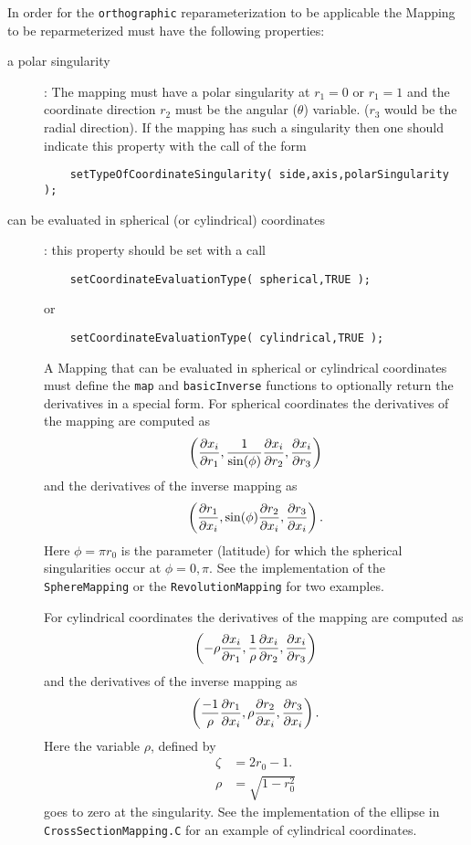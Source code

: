   In order for the {\tt orthographic} reparameterization to be applicable the Mapping
to be reparmeterized must have the following properties:
\begin{description}
  \item[a polar singularity] : The mapping must have a polar singularity at $r_1=0$ or
$r_1=1$ and the coordinate direction $r_2$ must be the angular ($\theta$) variable. ($r_3$ would
be the radial direction). If the mapping has such a singularity then one should indicate this
property with the call of the form
\begin{verbatim}
	setTypeOfCoordinateSingularity( side,axis,polarSingularity ); 
\end{verbatim}
  \item[can be evaluated in spherical (or cylindrical) coordinates]: this property should be set with a call
\begin{verbatim}
	setCoordinateEvaluationType( spherical,TRUE ); 
\end{verbatim}
or
\begin{verbatim}
	setCoordinateEvaluationType( cylindrical,TRUE ); 
\end{verbatim}
   A Mapping that can be evaluated in spherical or cylindrical coordinates must define the {\tt map} and
   {\tt basicInverse} functions to optionally return the derivatives
   in a special form. For spherical coordinates the derivatives of the mapping are computed as
\[
   \left({\partial x_i \over\partial r_1},{1\over\sin(\phi)}{\partial x_i \over\partial r_2},
         {\partial x_i \over\partial r_3} \right)
\]
and the derivatives of the inverse mapping as
\[
   \left({\partial r_1\over\partial x_i},\sin(\phi){\partial r_2 \over\partial x_i},
         {\partial r_3\over\partial x_i} \right).
\]
Here $\phi=\pi r_0$ is the parameter (latitude) for which the spherical singularities occur
at $\phi=0,\pi$.
See the implementation of the {\tt SphereMapping} or the {\tt RevolutionMapping} for two examples.

For cylindrical coordinates the derivatives of the mapping are computed as
\[
   \left(-\rho {\partial x_i \over\partial r_1},{1\over\rho}{\partial x_i \over\partial r_2},
         {\partial x_i \over\partial r_3} \right)
\]
and the derivatives of the inverse mapping as
\[
   \left({-1\over\rho}{\partial r_1\over\partial x_i},\rho{\partial r_2 \over\partial x_i},
         {\partial r_3\over\partial x_i} \right).
\]
Here the variable $\rho$, defined by
\begin{align*}
 \zeta &= 2 r_0 -1. \\
  \rho &= \sqrt{ 1- r_0^2 } 
\end{align*}
goes to zero at the singularity.
See the implementation of the ellipse in {\tt CrossSectionMapping.C} for an example of cylindrical
coordinates.
\end{description}




